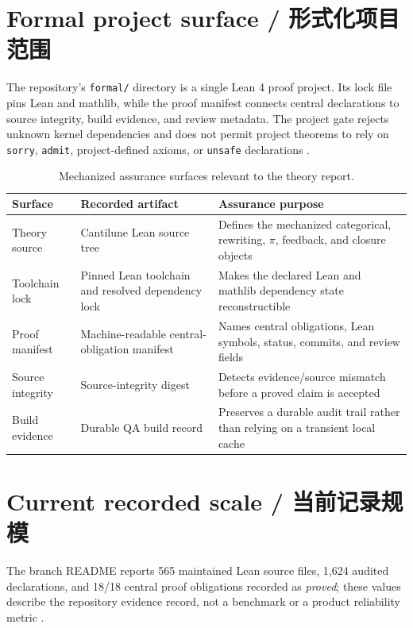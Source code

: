 \label{ch:infrastructure}

\section{Formal project surface / 形式化项目范围}

The repository's \texttt{formal/} directory is a single Lean 4 proof project. Its lock file pins
Lean and mathlib, while the proof manifest connects central declarations to source integrity,
build evidence, and review metadata. The project gate rejects unknown kernel dependencies and
does not permit project theorems to rely on \texttt{sorry}, \texttt{admit}, project-defined axioms,
or \texttt{unsafe} declarations \citep{cantiluneFormalReadme}.

\begin{table}[H]
\centering
\caption{Mechanized assurance surfaces relevant to the theory report.}
\label{tab:infra}
\begin{tabularx}{\textwidth}{@{}L{0.25\textwidth}L{0.29\textwidth}Y@{}}
\toprule
{}
\textbf{Surface} & \textbf{Recorded artifact} & \textbf{Assurance purpose} \\
\midrule
Theory source & Cantilune Lean source tree & Defines the mechanized categorical, rewriting, \(\pi\), feedback, and closure objects \\
Toolchain lock & Pinned Lean toolchain and resolved dependency lock & Makes the declared Lean and mathlib dependency state reconstructible \\
Proof manifest & Machine-readable central-obligation manifest & Names central obligations, Lean symbols, status, commits, and review fields \\
Source integrity & Source-integrity digest & Detects evidence/source mismatch before a proved claim is accepted \\
Build evidence & Durable QA build record & Preserves a durable audit trail rather than relying on a transient local cache \\
\bottomrule
\end{tabularx}
\end{table}

\section{Current recorded scale / 当前记录规模}

The branch README reports 565 maintained Lean source files, 1,624 audited declarations, and
18/18 central proof obligations recorded as \emph{proved}; these values describe the repository
evidence record, not a benchmark or a product reliability metric \citep{cantiluneReadme,cantiluneManifest}.

